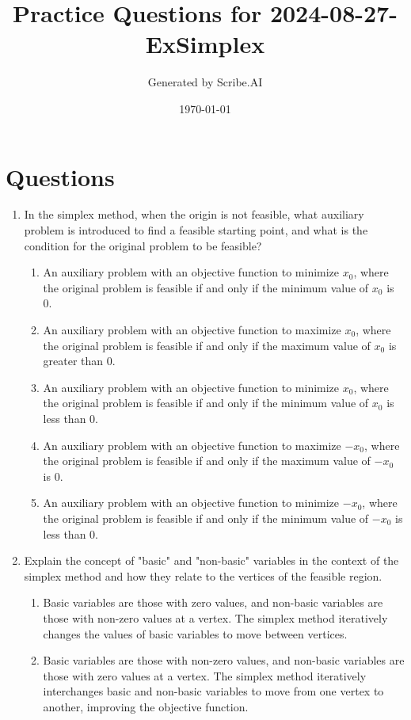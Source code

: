 \documentclass{article}%
\title{Practice Questions for 2024{-}08{-}27{-}ExSimplex}%
\author{Generated by Scribe.AI}%
\date{\today}%
\begin{document}
%
\normalsize%
\maketitle%
\section{Questions}%
\label{sec:Questions}%
\begin{enumerate}%
\item In the simplex method, when the origin is not feasible, what auxiliary problem is introduced to find a feasible starting point, and what is the condition for the original problem to be feasible?%
\begin{enumerate}%
\item An auxiliary problem with an objective function to minimize $x_0$, where the original problem is feasible if and only if the minimum value of $x_0$ is 0.%
\item An auxiliary problem with an objective function to maximize $x_0$, where the original problem is feasible if and only if the maximum value of $x_0$ is greater than 0.%
\item An auxiliary problem with an objective function to minimize $x_0$, where the original problem is feasible if and only if the minimum value of $x_0$ is less than 0.%
\item An auxiliary problem with an objective function to maximize $-x_0$, where the original problem is feasible if and only if the maximum value of $-x_0$ is 0.%
\item An auxiliary problem with an objective function to minimize $-x_0$, where the original problem is feasible if and only if the minimum value of $-x_0$ is less than 0.%
\end{enumerate}%
\vspace{1em}%
\item Explain the concept of "basic" and "non-basic" variables in the context of the simplex method and how they relate to the vertices of the feasible region.%
\begin{enumerate}%
\item Basic variables are those with zero values, and non-basic variables are those with non-zero values at a vertex.  The simplex method iteratively changes the values of basic variables to move between vertices.%
\item Basic variables are those with non-zero values, and non-basic variables are those with zero values at a vertex. The simplex method iteratively interchanges basic and non-basic variables to move from one vertex to another, improving the objective function.%

\end{enumerate}
\end{enumerate}
\end{document}
